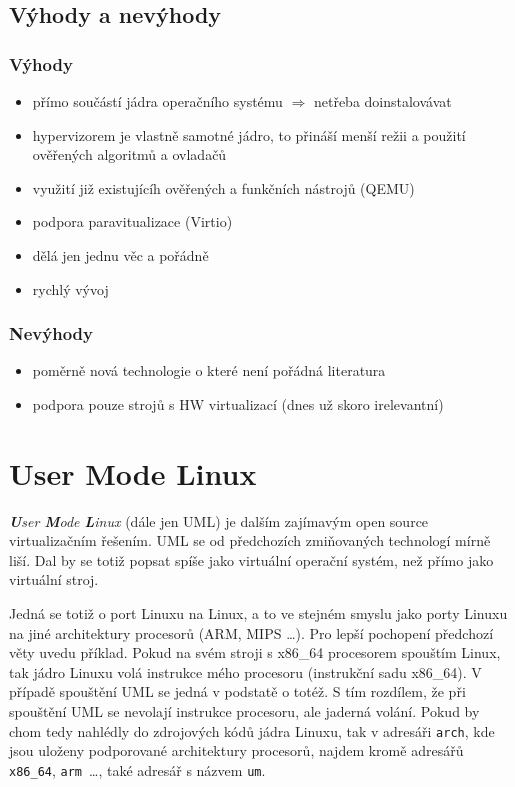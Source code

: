 \subsection{Výhody a nevýhody}
\subsubsection{Výhody}
\begin{itemize}
  \item přímo součástí jádra operačního systému $\Rightarrow$ netřeba doinstalovávat
  \item hypervizorem je vlastně samotné jádro, to přináší menší režii a použití ověřených algoritmů a ovladačů
  \item využití již existujícíh ověřených a funkčních nástrojů (QEMU)
  \item podpora paravitualizace (Virtio)
  \item dělá jen jednu věc a pořádně
  \item rychlý vývoj
\end{itemize}
\subsubsection{Nevýhody}
\begin{itemize}
  \item poměrně nová technologie o které není pořádná literatura
  \item podpora pouze strojů s HW virtualizací (dnes už skoro irelevantní)
\end{itemize}
\section{User Mode Linux}
\emph{\textbf{U}ser \textbf{M}ode \textbf{L}inux} (dále jen UML) je dalším zajímavým open source virtualizačním řešením. UML se od předchozích zmiňovaných technologí mírně liší. Dal by se totiž popsat spíše jako virtuální operační systém, než přímo jako virtuální stroj.

Jedná se totiž o port Linuxu na Linux, a to ve stejném smyslu jako porty Linuxu na jiné architektury procesorů (ARM, MIPS \dots). Pro lepší pochopení předchozí věty uvedu příklad. Pokud na svém stroji s x86\_64 procesorem spouštím Linux, tak jádro Linuxu volá instrukce mého procesoru (instrukční sadu x86\_64). V případě spouštění UML se jedná v podstatě o totéž. S tím rozdílem, že při spouštění UML se nevolají instrukce procesoru, ale jaderná volání. Pokud by chom tedy nahlédly do zdrojových kódů jádra Linuxu, tak v adresáři \texttt{arch}, kde jsou uloženy podporované architektury procesorů, najdem kromě adresářů \texttt{x86\_64}, \texttt{arm}~\dots, také adresář s názvem \texttt{um}.

